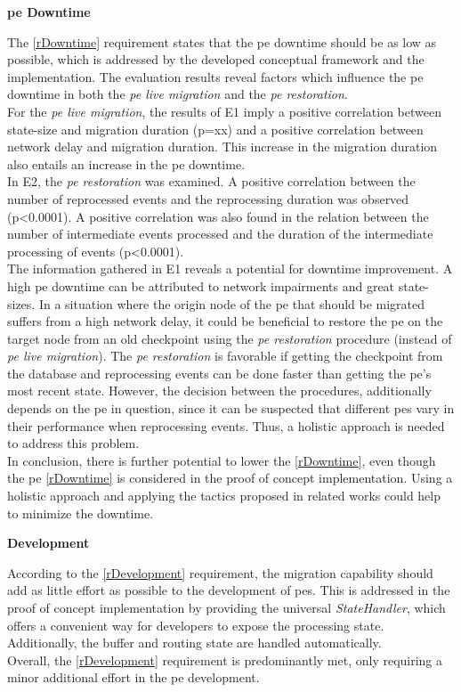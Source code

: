 \textbf{\acrlong{pe} Downtime}\par
The \ref{rDowntime} requirement states that the \gls{pe} downtime should be as low as possible, which is addressed by the developed conceptual framework and the implementation. The evaluation results reveal factors which influence the \gls{pe} downtime in both the \textit{\acrshort{pe} live migration} and the \textit{\acrshort{pe} restoration}.\\
For the \textit{\acrshort{pe} live migration}, the results of E1 imply a positive correlation between state-size and migration duration (p=xx) and a positive correlation between network delay and migration duration. This increase in the migration duration also entails an increase in the \gls{pe} downtime.\\
In E2, the \textit{\acrshort{pe} restoration} was examined. A positive correlation between the number of reprocessed events and the reprocessing duration was observed (p<0.0001). A positive correlation was also found in the relation between the number of intermediate events processed and the duration of the intermediate processing of events (p<0.0001).\\
The information gathered in E1 reveals a potential for downtime improvement. A high \gls{pe} downtime can be attributed to network impairments and great state-sizes. In a situation where the origin node of the \gls{pe} that should be migrated suffers from a high network delay, it could be beneficial to restore the \gls{pe} on the target node from an old checkpoint using the \textit{\acrshort{pe} restoration} procedure (instead of \textit{\acrshort{pe} live migration}). The \textit{\acrshort{pe} restoration} is favorable if getting the checkpoint from the database and reprocessing events can be done faster than getting the \gls{pe}'s most recent state. However, the decision between the procedures, additionally depends on the \gls{pe} in question, since it can be suspected that different \gls{pe}s vary in their performance when reprocessing events. Thus, a holistic approach is needed to address this problem.\\
In conclusion, there is further potential to lower the \ref{rDowntime}, even though the \gls{pe} \ref{rDowntime} is considered in the proof of concept implementation. Using a holistic approach and applying the tactics proposed in related works could help to minimize the downtime.\par


\textbf{Development}\par
According to the \ref{rDevelopment} requirement, the migration capability should add as little effort as possible to the development of \gls{pe}s. This is addressed in the proof of concept implementation by providing the universal \textit{StateHandler}, which offers a convenient way for developers to expose the processing state. Additionally, the buffer and routing state are handled automatically.\\
Overall, the \ref{rDevelopment} requirement is predominantly met, only requiring a minor additional effort in the \gls{pe} development.\par


